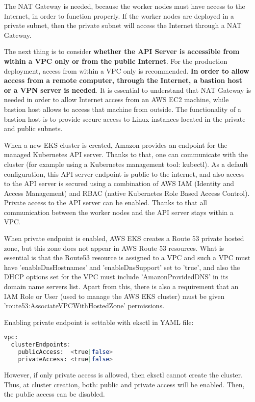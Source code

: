 The NAT Gateway is needed, because the worker nodes must have access to the Internet, in order to function properly. If the worker nodes are deployed in a private subnet, then the private subnet will access the Internet through a NAT Gateway\cite{eks-net}.


The next thing is to consider \textbf{whether the API Server is accessible from within a VPC only or from the public Internet}. For the production deployment, access from within a VPC only is recommended. \textbf{In order to allow access from a remote computer, through the Internet, a bastion host or a VPN server is needed}\cite{gruntwork-howto}. It is essential to understand that NAT Gateway is needed in order to allow Internet access from an AWS EC2 machine, while bastion host allows to access that machine from outside. The functionality of a bastion host is to provide secure access to Linux instances located in the private and public subnets\cite{aws-bastion}.

When a new EKS cluster is created, Amazon provides an endpoint for the managed Kubernetes API server. Thanks to that, one can communicate with the cluster (for example using a Kubernetes management tool: kubectl). As a default configuration, this API server endpoint is public to the internet, and also access to the API server is secured using a combination of AWS IAM (Identity and Access Management) and RBAC (native Kubernetes Role Based Access Control). Private access to the API server can be enabled. Thanks to that all communication between the worker nodes and the API server stays within a VPC\cite{eks-cluster-endpoint}.

When private endpoint is enabled, AWS EKS creates a Route 53 private hosted zone, but this zone does not appear in AWS Route 53 resources. What is essential is that the Route53 resource is assigned to a VPC and such a VPC must have 'enableDnsHostnames' and 'enableDnsSupport' set to 'true', and also the DHCP options set for the VPC must include 'AmazonProvidedDNS' in its domain name servers list. Apart from this, there is also a requirement that an IAM Role or User (used to manage the AWS EKS cluster) must be given 'route53:AssociateVPCWithHostedZone' permissions\cite{eks-cluster-endpoint}.

Enabling private endpoint is settable with eksctl in YAML file\cite{eksctl-net}:
\begin{lstlisting}[basicstyle=\small,caption={YAML configuration used by eksctl to set EKS cluster endpoints},captionpos=b,language=Bash,xleftmargin=1cm]
vpc:
  clusterEndpoints:
    publicAccess:  <true|false>
    privateAccess: <true|false>
\end{lstlisting}
However, if only private access is allowed, then eksctl cannot create the cluster. Thus, at cluster creation, both: public and private access will be enabled. Then, the public access can be disabled\cite{eksctl-net}.


